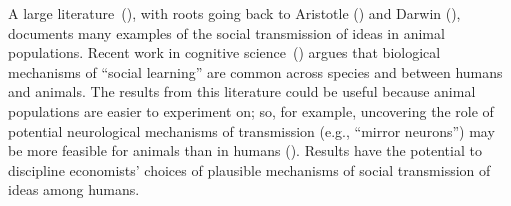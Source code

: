A large literature~(\cite{whiten2021burgeoning}), with roots going back to Aristotle (\cite{laland2009animal}) and Darwin (\cite{heyes1996social}), documents many examples of the social transmission of ideas in animal populations.  Recent work in cognitive science~(\cite{kendal2018social}) argues that biological mechanisms of ``social learning'' are common across species and between humans and animals.  The results from this literature could be useful because animal populations are easier to experiment on; so, for example, uncovering the role of potential neurological mechanisms of transmission (e.g., ``mirror neurons'') may be more feasible for animals than in humans (\cite{carcea2019biological}).  Results have the potential to discipline economists' choices of plausible mechanisms of social transmission of ideas among humans.
